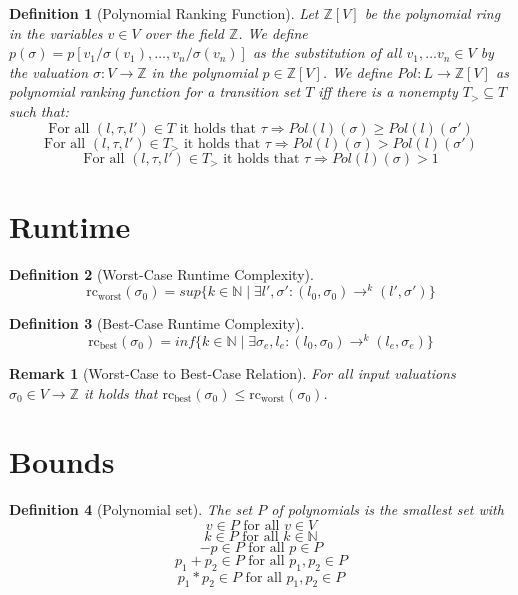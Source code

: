 \documentclass{scrartcl}
\newtheorem{definition}{Definition}
\newtheorem{remark}{Remark}
\begin{document}
\begin{definition}[Polynomial Ranking Function] 
	Let $\mathbb{Z}[V]$ be the polynomial ring in the variables $v \in V$ over the field $\mathbb{Z}$.
	We define $p(\sigma) = p[v_1/\sigma(v_1), \dots, v_n/\sigma(v_n)]$ as the substitution of all $v_1, \dots v_n \in V$ by the valuation $\sigma: V \rightarrow \mathbb{Z}$ in the polynomial $p \in \mathbb{Z}[V]$.
	We define $\mathit{Pol}: L \rightarrow \mathbb{Z}[V]$ as polynomial ranking function for a transition set $T$ iff there is a nonempty $T_{>} \subseteq T$ such that:
	\[ \text{For all } (l, \tau, l') \in T \text{ it holds that } \tau \Rightarrow \mathit{Pol}(l)(\sigma) \geq \mathit{Pol}(l)(\sigma') \]
	\[ \text{For all } (l, \tau, l') \in T_{>} \text{ it holds that } \tau \Rightarrow \mathit{Pol}(l)(\sigma) > \mathit{Pol}(l)(\sigma') \]
	\[ \text{For all } (l, \tau, l') \in T_{>} \text{ it holds that } \tau \Rightarrow \mathit{Pol}(l)(\sigma) > 1 \]
\end{definition}

\section{Runtime}

\begin{definition}[Worst-Case Runtime Complexity]
	\[ \text{rc}_{\text{worst}}(\sigma_0) = \mathit{sup} \lbrace k \in \mathbb{N} \mid \exists l', \sigma': (l_0, \sigma_0) \rightarrow^k (l', \sigma') \rbrace \]
\end{definition}

\begin{definition}[Best-Case Runtime Complexity]
	\[ \text{rc}_{\text{best}}(\sigma_0) = \mathit{inf} \lbrace k \in \mathbb{N} \mid \exists \sigma_e, l_e: (l_0, \sigma_0) \rightarrow^k (l_e, \sigma_e) \rbrace \]
\end{definition}

\begin{remark}[Worst-Case to Best-Case Relation]
	For all input valuations $\sigma_0 \in V \rightarrow \mathbb{Z}$ it holds that $\text{rc}_{\text{best}}(\sigma_0) \leq \text{rc}_{\text{worst}}(\sigma_0)$.
\end{remark}

\section{Bounds}

\begin{definition}[Polynomial set]
	The set $P$ of polynomials is the smallest set with
	\[ v \in P \text{ for all } v \in V \] 
	\[ k \in P \text{ for all } k \in \mathbb{N} \]
	\[ -p \in P \text{ for all } p \in P \]
	\[ p_1 + p_2 \in P \text{ for all } p_1, p_2 \in P \]
	\[ p_1 * p_2 \in P \text{ for all } p_1, p_2 \in P \]
\end{definition}
\end{document}
